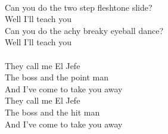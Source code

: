 \documentclass[10pt]{article}
\begin{document}
\begin{textblock*}{60mm}
\\
Can you do the two step fleshtone slide? \\
Well I'll teach you \\
Can you do the achy breaky eyeball dance? \\
Well I'll teach you \\
\\
They call me El Jefe \\
The boss and the point man \\
And I've come to take you away \\
They call me El Jefe \\
The boss and the hit man \\
And I've come to take you away
\end{textblock*}

\end{document}
